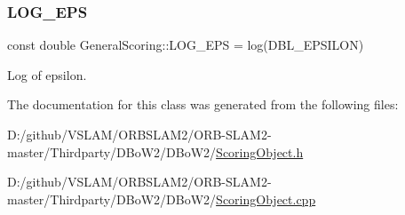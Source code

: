 \subsubsection{\texorpdfstring{L\+O\+G\+\_\+\+E\+PS}{LOG\_EPS}}
{\footnotesize\ttfamily const double General\+Scoring\+::\+L\+O\+G\+\_\+\+E\+PS = log(D\+B\+L\+\_\+\+E\+P\+S\+I\+L\+ON)\hspace{0.3cm}{\ttfamily [static]}}



Log of epsilon. 



The documentation for this class was generated from the following files\+:\begin{DoxyCompactItemize}
\item 
D\+:/github/\+V\+S\+L\+A\+M/\+O\+R\+B\+S\+L\+A\+M2/\+O\+R\+B-\/\+S\+L\+A\+M2-\/master/\+Thirdparty/\+D\+Bo\+W2/\+D\+Bo\+W2/\mbox{\hyperlink{_scoring_object_8h}{Scoring\+Object.\+h}}\item 
D\+:/github/\+V\+S\+L\+A\+M/\+O\+R\+B\+S\+L\+A\+M2/\+O\+R\+B-\/\+S\+L\+A\+M2-\/master/\+Thirdparty/\+D\+Bo\+W2/\+D\+Bo\+W2/\mbox{\hyperlink{_scoring_object_8cpp}{Scoring\+Object.\+cpp}}\end{DoxyCompactItemize}
